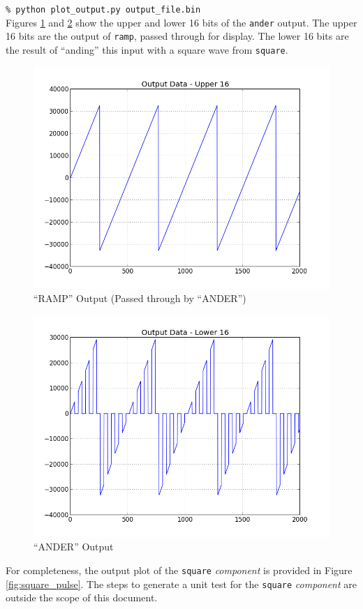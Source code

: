 \forceindent\verb+% python plot_output.py output_file.bin+\\
\bend
\bstart
Figures \ref{fig:upper16} and \ref{fig:lower16} show the upper and lower 16 bits of the \verb+ander+ output. The upper 16 bits are the output of \verb+ramp+, passed through for display. The lower 16 bits are the result of ``anding'' this input with a square wave from \verb+square+.\\

        \begin{figure}[H]
                \centering
                \includegraphics[scale=0.5]{./figures/upper16.jpg}
                \caption{``RAMP'' Output (Passed through by ``ANDER'')}
                \label{fig:upper16}
        \end{figure}

        \begin{figure}[H]
                \centering
                \includegraphics[scale=0.5]{./figures/lower16.jpg}
                \caption{``ANDER'' Output}
                \label{fig:lower16}
        \end{figure}
\bend
\bstart
For completeness, the output plot of the \verb+square+ \textit{component} is provided in Figure \ref{fig:square_pulse}. The steps to generate a unit test for the \verb+square+ \textit{component} are outside the scope of this document.

